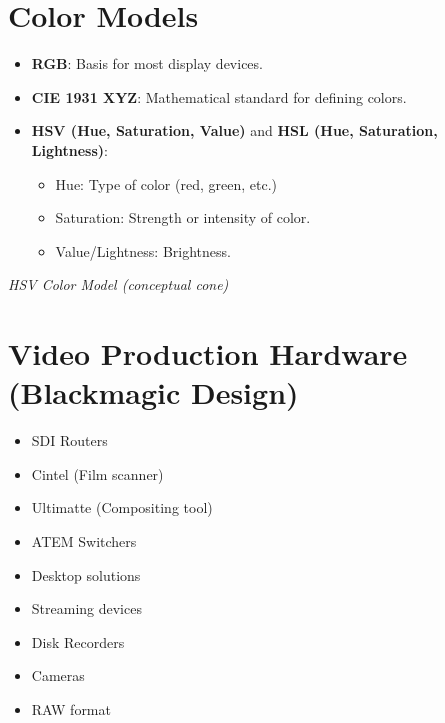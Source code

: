 \documentclass[12pt,a4paper]{article}
\begin{document}
\section{Color Models}
\begin{itemize}
    \item \textbf{RGB}: Basis for most display devices.
    \item \textbf{CIE 1931 XYZ}: Mathematical standard for defining colors.
    \item \textbf{HSV (Hue, Saturation, Value)} and \textbf{HSL (Hue, Saturation, Lightness)}:
    \begin{itemize}
        \item Hue: Type of color (red, green, etc.)
        \item Saturation: Strength or intensity of color.
        \item Value/Lightness: Brightness.
    \end{itemize}
\end{itemize}

\begin{center}

\textit{HSV Color Model (conceptual cone)}
\end{center}

\section{Video Production Hardware (Blackmagic Design)}
\begin{itemize}
    \item SDI Routers
    \item Cintel (Film scanner)
    \item Ultimatte (Compositing tool)
    \item ATEM Switchers
    \item Desktop solutions
    \item Streaming devices
    \item Disk Recorders
    \item Cameras
    \item RAW format
\end{itemize}
\end{document}
